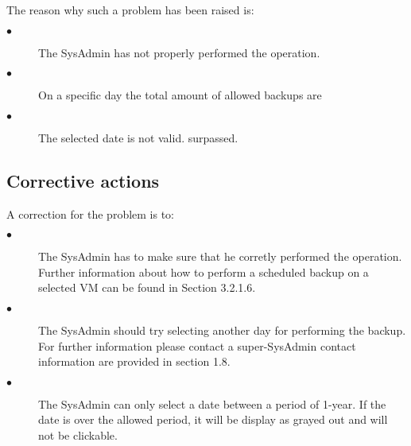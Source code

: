The reason why such a problem has been raised is:\\
\begin{description}
\item[$\bullet$] The SysAdmin has not properly performed the operation.
\item[$\bullet$] On a specific day the total amount of allowed backups are
\item[$\bullet$] The selected date is not valid.
surpassed.
\end{description}


\subsection{Corrective actions}

A correction for the problem is to:\\
\begin{description}
\item[$\bullet$] The SysAdmin has to make sure that he corretly performed the
operation. Further information about how to perform a scheduled backup on a
selected VM can be found in Section 3.2.1.6.
\item[$\bullet$] The SysAdmin should try selecting another day for performing
the backup. For further information please contact a super-SysAdmin contact
information are provided in section 1.8.
\item[$\bullet$] The SysAdmin can only select a date between a period of 1-year.
If the date is over the allowed period, it will be display as grayed out and
will not be clickable.
\end{description}








